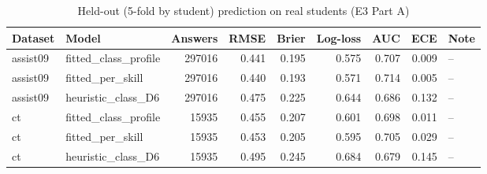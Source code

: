 \begin{table}[htbp]
\centering\small
\caption{Held-out (5-fold by student) prediction on real students (E3 Part A)}
\label{tab:t5}
\begin{tabular}{llrrrrrrl}
\toprule
Dataset & Model & Answers & RMSE & Brier & Log-loss & AUC & ECE & Note \\
\midrule
assist09 & fitted\_class\_profile & 297016 & 0.441 & 0.195 & 0.575 & 0.707 & 0.009 & -- \\
assist09 & fitted\_per\_skill & 297016 & 0.440 & 0.193 & 0.571 & 0.714 & 0.005 & -- \\
assist09 & heuristic\_class\_D6 & 297016 & 0.475 & 0.225 & 0.644 & 0.686 & 0.132 & -- \\
ct & fitted\_class\_profile & 15935 & 0.455 & 0.207 & 0.601 & 0.698 & 0.011 & -- \\
ct & fitted\_per\_skill & 15935 & 0.453 & 0.205 & 0.595 & 0.705 & 0.029 & -- \\
ct & heuristic\_class\_D6 & 15935 & 0.495 & 0.245 & 0.684 & 0.679 & 0.145 & -- \\
\bottomrule
\end{tabular}
\end{table}
